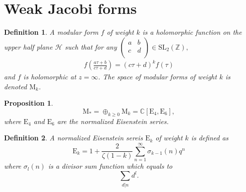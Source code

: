 \documentclass[uplatex,dvipdfmx]{jsarticle}
\newtheorem{definition}{Definition}[section]
\newtheorem{proposition}{Proposition}[section]
\begin{document}
\section{Weak Jacobi forms}

\begin{definition}
    A \textit{modular form}
    $f$
    of weight
    $k$
    is a holomorphic function on the upper half plane
    $\mathcal{H}$
    such that for any
    $\begin{pmatrix}
        a &b \\
        c &d \\
    \end{pmatrix}
    \in \mathrm{SL}_2 \left( \mathbb{Z} \right),$
    \begin{align}
        f
        \left( 
        \frac{a \tau + b}{c \tau + d}
        \right)
        =
        (c \tau + d)^k
        f \left( \tau \right)
    \end{align}
    and
    $f$
    is holomorphic at
    $z = \infty$.
    The space of modular forms of weight
    $k$
    is denoted
    $\mathrm{M}_k$.
\end{definition}

\begin{proposition}
    \begin{equation}
        \mathrm{M}_* 
        = 
        \oplus_{k \geq 0} \mathrm{M}_k
        =
        \mathbb{C}[\mathrm{E}_4, \mathrm{E}_6],
    \end{equation}
    where
    $\mathrm{E}_4$
    and
    $\mathrm{E}_6$
    are the normalized Eisenstein series.
\end{proposition}

\begin{definition}
    A normalized Eisenstein sereis
    $\mathrm{E}_k$
    of weight
    $k$
    is defined as
    \begin{equation}
        \mathrm{E}_k
        =
        1 + \frac{2}{\zeta(1 - k)}
        \sum_{n = 1}^\infty
        \sigma_{k - 1}(n) q^n
    \end{equation}
    where
    $\sigma_l(n)$
    is a divisor sum function
    which equals to
    \begin{equation}
        \sum_{d | n} d^l.
    \end{equation}
\end{definition}
\end{document}
